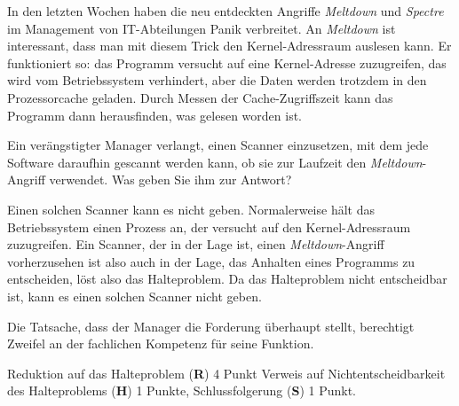In den letzten Wochen haben die neu entdeckten Angriffe {\em Meltdown} und
{\em Spectre} im Management von IT-Abteilungen Panik verbreitet.
An {\em Meltdown} ist interessant, dass man mit diesem Trick den
Kernel-Adressraum auslesen kann.
Er funktioniert so: das Programm versucht auf eine Kernel-Adresse
zuzugreifen, das wird vom Betriebssystem verhindert, aber die Daten werden
trotzdem in den Prozessorcache geladen.
Durch Messen der Cache-Zugriffszeit kann das Programm dann
herausfinden, was gelesen worden ist.

Ein verängstigter Manager verlangt, einen Scanner einzusetzen, mit dem 
jede Software daraufhin gescannt werden kann, ob sie zur Laufzeit
den {\em Meltdown}-Angriff verwendet.
Was geben Sie ihm zur Antwort?


\begin{loesung}
Einen solchen Scanner kann es nicht geben.
Normalerweise hält das Betriebssystem einen Prozess an, der versucht
auf den Kernel-Adressraum zuzugreifen.
Ein Scanner, der in der Lage ist, einen {\em Meltdown}-Angriff vorherzusehen
ist also auch in der Lage, das Anhalten eines Programms zu entscheiden,
löst also das Halteproblem.
Da das Halteproblem nicht entscheidbar ist, kann es einen solchen
Scanner nicht geben.
\end{loesung}

\begin{diskussion}
Die Tatsache, dass der Manager die Forderung überhaupt stellt,
berechtigt Zweifel an der fachlichen Kompetenz für seine Funktion.
\end{diskussion}

\begin{bewertung}
Reduktion auf das Halteproblem ({\bf R}) 4 Punkt
Verweis auf Nichtentscheidbarkeit des Halteproblems ({\bf H}) 1 Punkte,
Schlussfolgerung ({\bf S}) 1 Punkt.
\end{bewertung}

